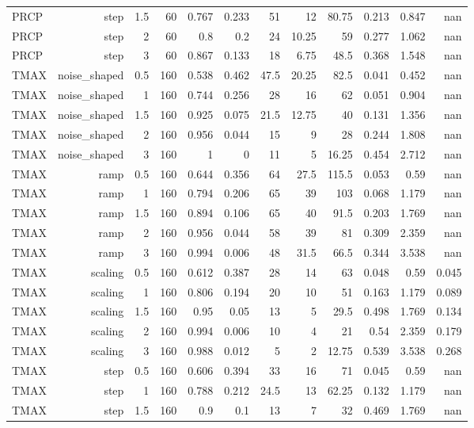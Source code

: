 \documentclass[10pt,a4paper]{article}
\begin{document}
{\begin{longtable}{lrrrrrrrrrrr}
PRCP & step & 1.5 & 60 & 0.767 & 0.233 & 51 & 12 & 80.75 & 0.213 & 0.847 & nan \\
PRCP & step & 2 & 60 & 0.8 & 0.2 & 24 & 10.25 & 59 & 0.277 & 1.062 & nan \\
PRCP & step & 3 & 60 & 0.867 & 0.133 & 18 & 6.75 & 48.5 & 0.368 & 1.548 & nan \\
TMAX & noise\_\allowbreak{}shaped & 0.5 & 160 & 0.538 & 0.462 & 47.5 & 20.25 & 82.5 & 0.041 & 0.452 & nan \\
TMAX & noise\_\allowbreak{}shaped & 1 & 160 & 0.744 & 0.256 & 28 & 16 & 62 & 0.051 & 0.904 & nan \\
TMAX & noise\_\allowbreak{}shaped & 1.5 & 160 & 0.925 & 0.075 & 21.5 & 12.75 & 40 & 0.131 & 1.356 & nan \\
TMAX & noise\_\allowbreak{}shaped & 2 & 160 & 0.956 & 0.044 & 15 & 9 & 28 & 0.244 & 1.808 & nan \\
TMAX & noise\_\allowbreak{}shaped & 3 & 160 & 1 & 0 & 11 & 5 & 16.25 & 0.454 & 2.712 & nan \\
TMAX & ramp & 0.5 & 160 & 0.644 & 0.356 & 64 & 27.5 & 115.5 & 0.053 & 0.59 & nan \\
TMAX & ramp & 1 & 160 & 0.794 & 0.206 & 65 & 39 & 103 & 0.068 & 1.179 & nan \\
TMAX & ramp & 1.5 & 160 & 0.894 & 0.106 & 65 & 40 & 91.5 & 0.203 & 1.769 & nan \\
TMAX & ramp & 2 & 160 & 0.956 & 0.044 & 58 & 39 & 81 & 0.309 & 2.359 & nan \\
TMAX & ramp & 3 & 160 & 0.994 & 0.006 & 48 & 31.5 & 66.5 & 0.344 & 3.538 & nan \\
TMAX & scaling & 0.5 & 160 & 0.612 & 0.387 & 28 & 14 & 63 & 0.048 & 0.59 & 0.045 \\
TMAX & scaling & 1 & 160 & 0.806 & 0.194 & 20 & 10 & 51 & 0.163 & 1.179 & 0.089 \\
TMAX & scaling & 1.5 & 160 & 0.95 & 0.05 & 13 & 5 & 29.5 & 0.498 & 1.769 & 0.134 \\
TMAX & scaling & 2 & 160 & 0.994 & 0.006 & 10 & 4 & 21 & 0.54 & 2.359 & 0.179 \\
TMAX & scaling & 3 & 160 & 0.988 & 0.012 & 5 & 2 & 12.75 & 0.539 & 3.538 & 0.268 \\
TMAX & step & 0.5 & 160 & 0.606 & 0.394 & 33 & 16 & 71 & 0.045 & 0.59 & nan \\
TMAX & step & 1 & 160 & 0.788 & 0.212 & 24.5 & 13 & 62.25 & 0.132 & 1.179 & nan \\
TMAX & step & 1.5 & 160 & 0.9 & 0.1 & 13 & 7 & 32 & 0.469 & 1.769 & nan \\

\end{longtable}}
\end{document}
